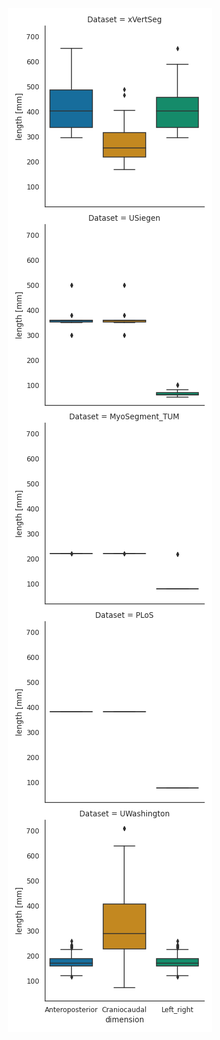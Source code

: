 \begin{figure}
    \centering
    \begin{minipage}{.4\textwidth}
        \includegraphics[width=.98\textwidth]{automated_graphs/AllDataset_DimensionsBoxplot.png}

\end{minipage}
\end{figure}
